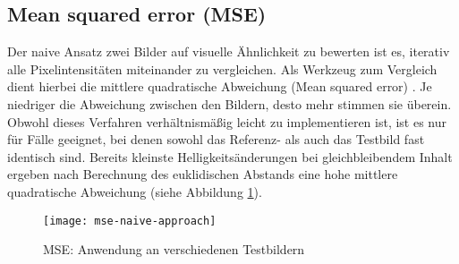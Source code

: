 \subsection{Mean squared error (MSE)}
Der naive Ansatz zwei Bilder auf visuelle Ähnlichkeit zu bewerten ist es,
iterativ alle Pixelintensitäten miteinander zu vergleichen. Als Werkzeug zum
Vergleich dient hierbei die mittlere quadratische Abweichung (Mean squared
error) \parencite{mse-overview}. Je niedriger die Abweichung zwischen den
Bildern, desto mehr stimmen sie überein. Obwohl dieses Verfahren verhältnismäßig
leicht zu implementieren ist, ist es nur für Fälle geeignet, bei denen sowohl
das Referenz- als auch das Testbild fast identisch sind. Bereits kleinste
Helligkeitsänderungen bei gleichbleibendem Inhalt ergeben nach Berechnung des
euklidischen Abstands eine hohe mittlere quadratische Abweichung (siehe
Abbildung \ref{fig:mse-naive}). \parencite{mse-naive-approach}

\begin{figure}[H]
    \centering
    \texttt{[image: mse-naive-approach]}
    \caption{MSE: Anwendung an verschiedenen Testbildern}
    \label{fig:mse-naive}
\end{figure}
